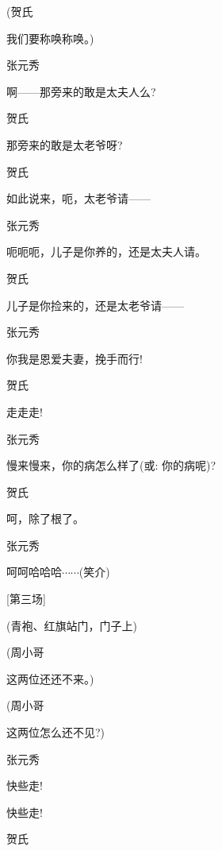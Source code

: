 (贺氏\hspace{30pt}~

我们要称唤称唤。)

张元秀\hspace{20pt}~

啊------那旁来的敢是太夫人么?

贺氏\hspace{30pt}~

那旁来的敢是太老爷呀?

贺氏\hspace{30pt}~

如此说来，呃，太老爷请------

张元秀\hspace{20pt}~

呃呃呃，儿子是你养的，还是太夫人请。

贺氏\hspace{30pt}~

儿子是你捡来的，还是太老爷请------

张元秀\hspace{20pt}~

你我是恩爱夫妻，挽手而行!

贺氏\hspace{30pt}~

走走走!

张元秀\hspace{20pt}~

慢来慢来，你的病怎么样了({\akai 或}: 你的病呢)?

贺氏\hspace{30pt}~

呵，除了根了。

张元秀\hspace{20pt}~

呵呵哈哈哈$\cdots{}\cdots{}$(笑介)

{{[}第三场{]}}

(青袍、红旗站门，门子上)

(周小哥\hspace{20pt}~

这两位还还不来。)

(周小哥\hspace{20pt}~

这两位怎么还不见?)

张元秀\hspace{20pt}~

快些走!

快些走!

贺氏\hspace{30pt}~

